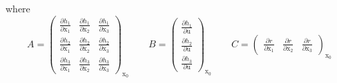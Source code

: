 where \begin{equation*} A = \begin{pmatrix}
  \frac{\partial{h_{1}}}{\partial{\text{x}_{1}}} & \frac{\partial{h_{1}}}{\partial{\text{x}_{2}}} & \frac{\partial{h_{1}}}{\partial{\text{x}_{3}}} \\
  \frac{\partial{h_{2}}}{\partial{\text{x}_{1}}} & \frac{\partial{h_{2}}}{\partial{\text{x}_{2}}} & \frac{\partial{h_{2}}}{\partial{\text{x}_{3}}} \\
  \frac{\partial{h_{3}}}{\partial{\text{x}_{1}}} & \frac{\partial{h_{3}}}{\partial{\text{x}_{2}}} & \frac{\partial{h_{3}}}{\partial{\text{x}_{3}}}
\end{pmatrix}_{\text{x}_{0}}
\qquad B = \begin{pmatrix}
\frac{\partial{h_{1}}}{\partial{\text{u}}} \\
\frac{\partial{h_{2}}}{\partial{\text{u}}} \\
\frac{\partial{h_{3}}}{\partial{\text{u}}}
\end{pmatrix}_{\text{x}_{0}}
\qquad C = \begin{pmatrix}
\frac{\partial{r}}{\partial{\text{x}_{1}}} & \frac{\partial{r}}{\partial{\text{x}_{2}}} & \frac{\partial{r}}{\partial{\text{x}_{3}}} 
\end{pmatrix}_{\text{x}_{0}}
\end{equation*}

